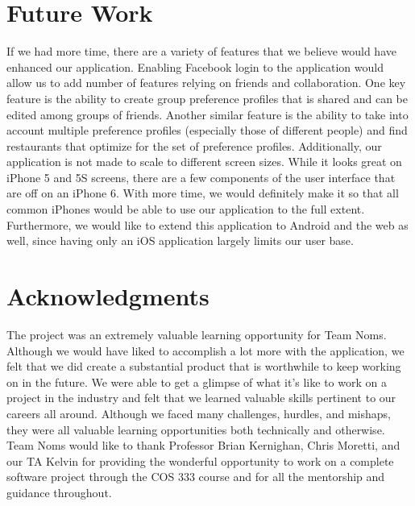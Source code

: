 \documentclass[12pt]{article}
\begin{document}
\section{Future Work}

If we had more time, there are a variety of features that we believe would have enhanced our application. Enabling Facebook login to the application would allow us to add number of features relying on friends and collaboration. One key feature is the ability to create group preference profiles that is shared and can be edited among groups of friends. Another similar feature is the ability to take into account multiple preference profiles (especially those of different people) and find restaurants that optimize for the set of preference profiles. 
Additionally, our application is not made to scale to different screen sizes. While it looks great on iPhone 5 and 5S screens, there are a few components of the user interface that are off on an iPhone 6. With more time, we would definitely make it so that all common iPhones would be able to use our application to the full extent. Furthermore, we would like to extend this application to Android and the web as well, since having only an iOS application largely limits our user base.

\section{Acknowledgments}
The project was an extremely valuable learning opportunity for Team Noms. Although we would have liked to accomplish a lot more with the application, we felt that we did create a substantial product that is worthwhile to keep working on in the future. We were able to get a glimpse of what it’s like to work on a project in the industry and felt that we learned valuable skills pertinent to our careers all around. Although we faced many challenges, hurdles, and mishaps, they were all valuable learning opportunities both technically and otherwise. 
Team Noms would like to thank Professor Brian Kernighan, Chris Moretti, and our TA Kelvin for providing the wonderful opportunity to work on a complete software project through the COS 333 course and for all the mentorship and guidance throughout.
\end{document}
